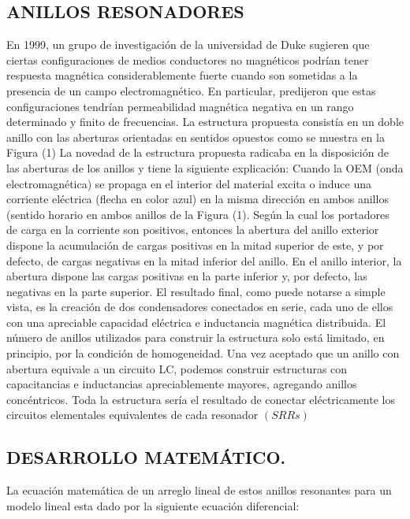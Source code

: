 \documentclass[11pt,letterpaper,twocolumn]{article}
\begin{document}
\subsection{ANILLOS RESONADORES}

En 1999, un grupo de investigación de la universidad de Duke sugieren que ciertas configuraciones de medios conductores no magnéticos podrían tener respuesta magnética considerablemente fuerte cuando son sometidas a la presencia de un campo electromagnético. En particular, predijeron que estas configuraciones tendrían permeabilidad magnética negativa en un rango determinado y finito de frecuencias. La estructura propuesta consistía en un doble anillo con las aberturas orientadas en sentidos opuestos como se muestra en la Figura (1) La novedad de la estructura propuesta  radicaba en la disposición de las aberturas de los anillos y tiene la siguiente explicación: Cuando la OEM (onda electromagnética)  se propaga en el interior del material excita o induce una corriente eléctrica (flecha en color azul) en la misma dirección en ambos anillos (sentido horario en ambos anillos de la Figura (1). Según la cual los portadores de carga en la corriente son positivos, entonces la abertura del anillo exterior dispone la acumulación de cargas positivas en la mitad superior de este, y por defecto, de cargas negativas en la mitad inferior del anillo. En el anillo interior, la abertura dispone las cargas positivas en la parte inferior y, por defecto, las negativas en la parte superior. El resultado final, como puede notarse a simple vista, es la creación de dos condensadores conectados en serie, cada uno de ellos con una apreciable capacidad eléctrica e inductancia magnética distribuida. El número de anillos utilizados para construir la estructura solo está limitado, en principio, por la condición de homogeneidad. Una vez aceptado que un anillo con abertura equivale a un circuito LC, podemos construir estructuras con capacitancias e inductancias apreciablemente mayores, agregando anillos concéntricos. Toda la estructura sería el resultado de conectar eléctricamente los circuitos elementales equivalentes de cada resonador $(SRRs)$

\subsection{DESARROLLO MATEMÁTICO.}
La ecuación matemática de  un arreglo lineal de estos anillos resonantes para un modelo lineal esta dado por la siguiente ecuación diferencial: 
\end{document}
